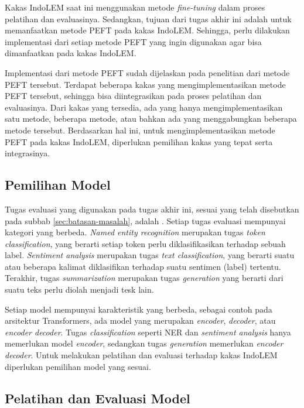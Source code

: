 Kakas IndoLEM saat ini menggunakan metode \textit{fine-tuning} dalam proses pelatihan dan evaluasinya. Sedangkan, tujuan dari tugas akhir ini adalah untuk memanfaatkan metode PEFT pada kakas IndoLEM. Sehingga, perlu dilakukan implementasi dari setiap metode PEFT yang ingin digunakan agar bisa dimanfaatkan pada kakas IndoLEM.

Implementasi dari metode PEFT sudah dijelaskan pada penelitian dari metode PEFT tersebut. Terdapat beberapa kakas yang mengimplementasikan metode PEFT tersebut, sehingga bisa diintegrasikan pada proses pelatihan dan evaluasinya. Dari kakas yang tersedia, ada yang hanya mengimplementasikan satu metode, beberapa metode, atau bahkan ada yang menggabungkan beberapa metode tersebut. Berdasarkan hal ini, untuk mengimplementasikan metode PEFT pada kakas IndoLEM, diperlukan pemilihan kakas yang tepat serta integrasinya.

\subsection{Pemilihan Model}

Tugas evaluasi yang digunakan pada tugas akhir ini, sesuai yang telah disebutkan pada subbab \ref{sec:batasan-masalah}, adalah \nlptask. Setiap tugas evaluasi mempunyai kategori yang berbeda. \textit{Named entity recognition} merupakan tugas \textit{token classification}, yang berarti setiap token perlu diklasifikasikan terhadap sebuah label. \textit{Sentiment analysis} merupakan tugas \textit{text classification},  yang berarti suatu atau beberapa kalimat diklasifikan terhadap suatu sentimen (label) tertentu. Terakhir, tugas \textit{summarization} merupakan tugas \textit{generation} yang berarti dari suatu teks perlu diolah menjadi tesk lain.

Setiap model mempunyai karakteristik yang berbeda, sebagai contoh pada arsitektur Transformers, ada model yang merupakan \textit{encoder}, \textit{decoder}, atau \textit{encoder decoder}. Tugas \textit{classification} seperti NER dan \textit{sentiment analysis} hanya memerlukan model \textit{encoder}, sedangkan tugas \textit{generation} memerlukan \textit{encoder decoder}. Untuk melakukan pelatihan dan evaluasi terhadap kakas IndoLEM diperlukan pemilihan model yang sesuai.

\subsection{Pelatihan dan Evaluasi Model}

